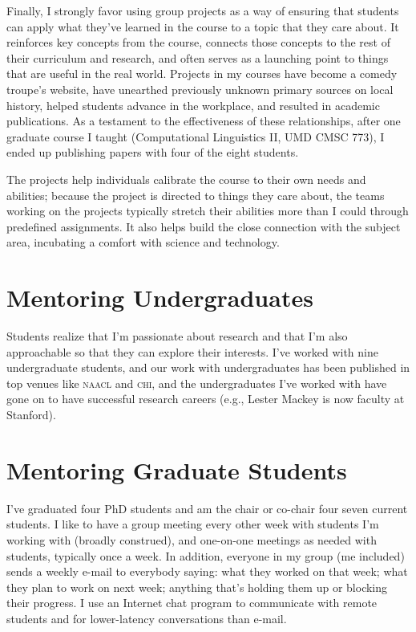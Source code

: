 \documentclass[11pt]{amsart}
\newcommand{\abr}[1]{\textsc{#1}}
\begin{document}
Finally, I strongly favor using group projects as a way of ensuring that
students can apply what they've learned in the course to a topic that they care
about.  It reinforces key concepts from the course, connects those concepts to
the rest of their curriculum and research, and often serves as a launching point
to things that are useful in the real world.  Projects in my courses have become
a comedy troupe's website, have unearthed previously unknown primary sources on
local history, helped students advance in the workplace, and resulted in
academic publications.  As a testament to the effectiveness of
these relationships, after one graduate course I taught (Computational
Linguistics II, UMD CMSC 773), I ended up publishing papers with four of the
eight students.

The projects help individuals calibrate the course to their own needs
and abilities; because the project is directed to things they
care about, the teams working on the projects typically stretch their
abilities more than I could through predefined assignments.  It also
helps build the close connection with the subject area, incubating a
comfort with science and technology.

\section{Mentoring Undergraduates}

Students realize that I'm passionate about research and that I'm also
approachable so that they can explore their interests.  I've worked
with nine undergraduate students, and our work with undergraduates has
been published in top venues like \abr{naacl} and \abr{chi}, and the
undergraduates I've worked with have gone on to have successful
research careers (e.g., Lester Mackey is now faculty at Stanford).

\section{Mentoring Graduate Students}

I've graduated four PhD students and am the chair or co-chair four
seven current students.  I like to have a group meeting every other
week with students I'm working with (broadly construed), and
one-on-one meetings as needed with students, typically once a week. In
addition, everyone in my group (me included) sends a weekly e-mail to
everybody saying: what they worked on that week; what they plan to work
on next week; anything that's holding them up or blocking their
progress. I use an Internet chat program to communicate with remote
students and for lower-latency conversations than e-mail.
\end{document}
